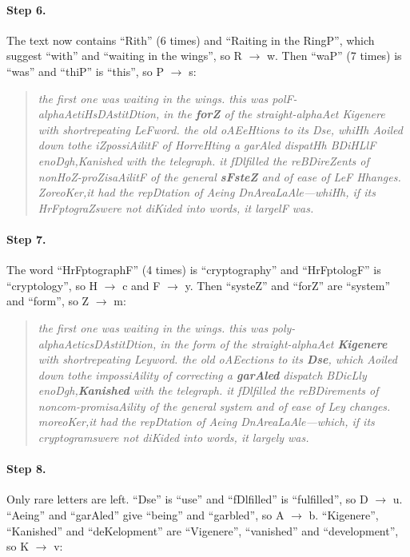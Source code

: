 \documentclass[12pt,a4paper]{article}
\newenvironment{cryptotext}{\begin{quote}\raggedright\itshape\small}{\end{quote}}
\begin{document}
\paragraph{Step 6.} The text now contains ``Rith'' (6 times) and ``Raiting in the RingP'',
which suggest ``with'' and ``waiting in the wings'', so R $\rightarrow$ w. Then ``waP'' (7
times) is ``was'' and ``thiP'' is ``this'', so P $\rightarrow$ s:

\begin{cryptotext}
the first one was waiting in the wings. this was polF-alphaAetiHsDAstitDtion, in the \textbf{forZ} of the straight-alphaAet Kigenere with shortrepeating LeFword. the old oAEeHtions to its Dse, whiHh Aoiled down tothe iZpossiAilitF of HorreHting a garAled dispatHh BDiHLlF enoDgh,Kanished with the telegraph. it fDlfilled the reBDireZents of nonHoZ-proZisaAilitF of the general \textbf{sFsteZ} and of ease of LeF Hhanges. ZoreoKer,it had the repDtation of Aeing DnAreaLaAle---whiHh, if its HrFptograZswere not diKided into words, it largelF was.
\end{cryptotext}

\paragraph{Step 7.} The word ``HrFptographF'' (4 times) is ``cryptography'' and ``HrFptologF''
is ``cryptology'', so H $\rightarrow$ c and F $\rightarrow$ y. Then ``systeZ'' and ``forZ''
are ``system'' and ``form'', so Z $\rightarrow$ m:

\begin{cryptotext}
the first one was waiting in the wings. this was poly-alphaAeticsDAstitDtion, in the form of the straight-alphaAet \textbf{Kigenere} with shortrepeating Leyword. the old oAEections to its \textbf{Dse}, which Aoiled down tothe impossiAility of correcting a \textbf{garAled} dispatch BDicLly enoDgh,\textbf{Kanished} with the telegraph. it fDlfilled the reBDirements of noncom-promisaAility of the general system and of ease of Ley changes. moreoKer,it had the repDtation of Aeing DnAreaLaAle---which, if its cryptogramswere not diKided into words, it largely was.
\end{cryptotext}

\paragraph{Step 8.} Only rare letters are left. ``Dse'' is ``use'' and ``fDlfilled'' is
``fulfilled'', so D $\rightarrow$ u. ``Aeing'' and ``garAled'' give ``being'' and
``garbled'', so A $\rightarrow$ b. ``Kigenere'', ``Kanished'' and ``deKelopment'' are
``Vigenere'', ``vanished'' and ``development'', so K $\rightarrow$ v:
\end{document}
